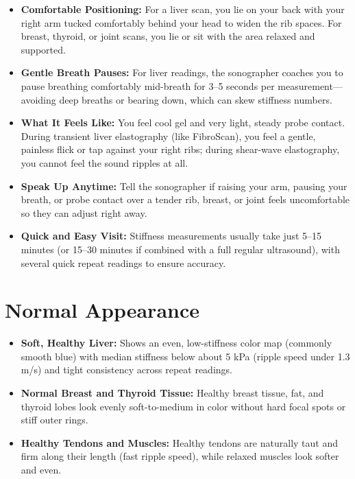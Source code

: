 \begin{itemize}
    \item \textbf{Comfortable Positioning:} For a liver scan, you lie on your back with your right arm tucked comfortably behind your head to widen the rib spaces. For breast, thyroid, or joint scans, you lie or sit with the area relaxed and supported.
    \item \textbf{Gentle Breath Pauses:} For liver readings, the sonographer coaches you to pause breathing comfortably mid-breath for 3--5 seconds per measurement---avoiding deep breaths or bearing down, which can skew stiffness numbers.
    \item \textbf{What It Feels Like:} You feel cool gel and very light, steady probe contact. During transient liver elastography (like FibroScan), you feel a gentle, painless flick or tap against your right ribs; during shear-wave elastography, you cannot feel the sound ripples at all.
    \item \textbf{Speak Up Anytime:} Tell the sonographer if raising your arm, pausing your breath, or probe contact over a tender rib, breast, or joint feels uncomfortable so they can adjust right away.
    \item \textbf{Quick and Easy Visit:} Stiffness measurements usually take just 5--15 minutes (or 15--30 minutes if combined with a full regular ultrasound), with several quick repeat readings to ensure accuracy.
\end{itemize}

\section{Normal Appearance}

\begin{itemize}
    \item \textbf{Soft, Healthy Liver:} Shows an even, low-stiffness color map (commonly smooth blue) with median stiffness below about 5 kPa (ripple speed under 1.3 m/s) and tight consistency across repeat readings.
    \item \textbf{Normal Breast and Thyroid Tissue:} Healthy breast tissue, fat, and thyroid lobes look evenly soft-to-medium in color without hard focal spots or stiff outer rings.
    \item \textbf{Healthy Tendons and Muscles:} Healthy tendons are naturally taut and firm along their length (fast ripple speed), while relaxed muscles look softer and even.
\end{itemize}

